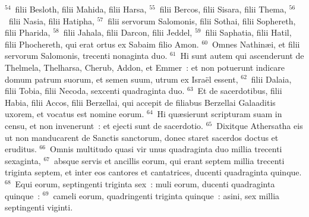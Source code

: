 ${}^{54}$~filii Besloth, filii Mahida, filii Harsa,
${}^{55}$~filii Bercos, filii Sisara, filii Thema,
${}^{56}$~filii Nasia, filii Hatipha,
${}^{57}$~filii servorum Salomonis, filii Sothai, filii Sophereth, filii Pharida,
${}^{58}$~filii Jahala, filii Darcon, filii Jeddel,
${}^{59}$~filii Saphatia, filii Hatil, filii Phochereth, qui erat ortus ex Sabaim filio Amon.
${}^{60}$~Omnes Nathin\ae i, et filii servorum Salomonis, trecenti nonaginta duo.
${}^{61}$~Hi sunt autem qui ascenderunt de Thelmela, Thelharsa, Cherub, Addon, et Emmer~: et non potuerunt indicare domum patrum suorum, et semen suum, utrum ex Isra\"el essent,
${}^{62}$~filii Dalaia, filii Tobia, filii Necoda, sexcenti quadraginta duo.
${}^{63}$~Et de sacerdotibus, filii Habia, filii Accos, filii Berzellai, qui accepit de filiabus Berzellai Galaaditis uxorem, et vocatus est nomine eorum.
${}^{64}$~Hi qu\ae sierunt scripturam suam in censu, et non invenerunt~: et ejecti sunt de sacerdotio.
${}^{65}$~Dixitque Athersatha eis ut non manducarent de Sanctis sanctorum, donec staret sacerdos doctus et eruditus.
${}^{66}$~Omnis multitudo quasi vir unus quadraginta duo millia trecenti sexaginta,
${}^{67}$~absque servis et ancillis eorum, qui erant septem millia trecenti triginta septem, et inter eos cantores et cantatrices, ducenti quadraginta quinque.
${}^{68}$~Equi eorum, septingenti triginta sex~: muli eorum, ducenti quadraginta quinque~:
${}^{69}$~cameli eorum, quadringenti triginta quinque~: asini, sex millia septingenti viginti.



